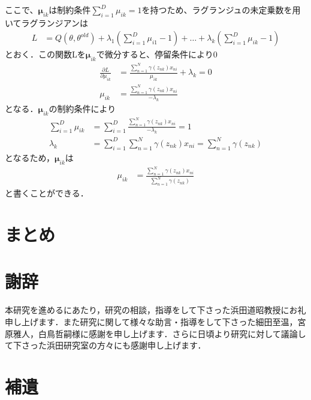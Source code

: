 \documentclass[dvipdfmx,autodetect-engine]{jsreport}
\begin{document}
ここで、$\bm{\mu}_{ik}$は制約条件$\sum_{i=1}^{D}\mu_{ik}=1$を持つため、ラグランジュの未定乗数を用いてラグランジアンは
\begin{align}
    L &= Q(\theta, \theta^{old}) + \lambda_1(\sum_{i=1}^{D} \mu_{i1} - 1) + \dots + \lambda_{k} ( \sum_{i=1}^{D} \mu_{ik} - 1 )
\end{align}
とおく．この関数Lを$\bm{\mu}_{ik}$で微分すると、停留条件により0
\begin{align}
    \frac{\partial L}{\partial \mu_{ik}} &= \frac{\sum_{n=1}^{N} \gamma(z_{nk}) x_{ni}}{\mu_{ik}} + \lambda_{k} = 0 \\
    \mu_{ik} &= \frac{\sum_{n=1}^{N} \gamma(z_{nk}) x_{ni}}{-\lambda_{k}}
\end{align}
となる．$\bm{\mu}_{ik}$の制約条件により
\begin{align}
    \sum_{i=1}^{D} \mu_{ik}&= \sum_{i=1}^{D} \frac{\sum_{n=1}^{N} \gamma(z_{nk}) x_{ni}}{-\lambda_{k}} = 1　\\
    \lambda_{k} &= \sum_{i=1}^{D} \sum_{n=1}^{N} \gamma(z_{nk}) x_{ni} = \sum_{n=1}^{N} \gamma(z_{nk})
\end{align}
となるため，$\bm{\mu}_{ik}$は
\begin{align}
    \mu_{ik} &= \frac{\sum_{n=1}^{N} \gamma(z_{nk}) x_{ni}}{\sum_{n=1}^{N} \gamma(z_{nk})}
\end{align}
と書くことができる．

\chapter{まとめ}

\chapter*{謝辞}
本研究を進めるにあたり，研究の相談，指導をして下さった浜田道昭教授にお礼申し上げます．また研究に関して様々な助言・指導をして下さった細田至温，宮原雅人，白鳥哲嗣様に感謝を申し上げます．さらに日頃より研究に対して議論して下さった浜田研究室の方々にも感謝申し上げます．






\clearpage

\appendix 

\chapter{補遺}
\end{document}
